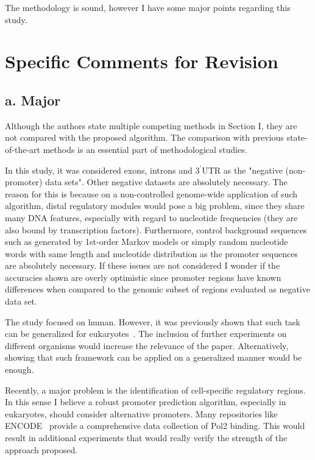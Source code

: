 \documentclass[11pt]{article}
\begin{document}
The methodology is sound, however I have some major points regarding this study.

\section{Specific Comments for Revision}

\subsection*{a. Major}

 Although the authors state multiple competing methods in Section I, they are not compared with the proposed algorithm. The comparison with previous state-of-the-art methods is an essential part of methodological studies.

 In this study, it was considered exons, introns and 3$^\prime$UTR as the "negative (non-promoter) data sets". Other negative datasets are absolutely necessary. The reason for this is because on a non-controlled genome-wide application of such algorithm, distal regulatory modules would pose a big problem, since they share many DNA features, especially with regard to nucleotide frequencies (they are also bound by transcription factors). Furthermore, control background sequences such as generated by 1st-order Markov models or simply random nucleotide words with same length and nucleotide distribution as the promoter sequences are absolutely necessary. If these issues are not considered I wonder if the accuracies shown are overly optimistic since promoter regions have known differences when compared to the genomic subset of regions evaluated as negative data set.

 The study focused on human. However, it was previously shown that such task can be generalized for eukaryotes~\cite{abeel2008}. The inclusion of further experiments on different organisms would increase the relevance of the paper. Alternatively, showing that such framework can be applied on a generalized manner would be enough.

 Recently, a major problem is the identification of cell-specific regulatory regions. In this sense I believe a robust promoter prediction algorithm, especially in eukaryotes, should consider alternative promoters. Many repositories like ENCODE~\cite{encode2012} provide a comprehensive data collection of Pol2 binding. This would result in additional experiments that would really verify the strength of the approach proposed.
\end{document}
